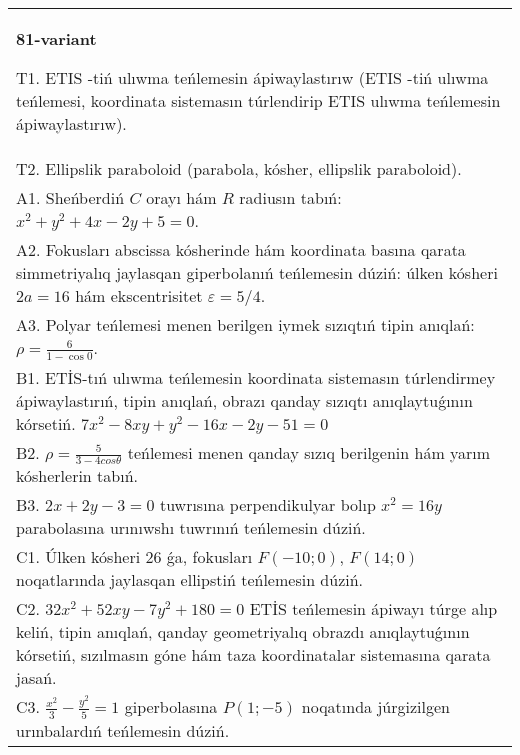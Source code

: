 \documentclass{article}
\begin{document}
\begin{tabular}{m{17cm}}
\textbf{81-variant}
\newline

T1. ETIS -tiń ulıwma teńlemesin ápiwaylastırıw (ETIS -tiń ulıwma teńlemesi, koordinata sistemasın túrlendirip ETIS ulıwma teńlemesin ápiwaylastırıw).\\

T2. Ellipslik paraboloid (parabola, kósher, ellipslik paraboloid).\\

A1. Sheńberdiń $C$ orayı hám $R$ radiusın tabıń: $x^2+y^2+4 x-2 y+5=0$.\\

A2. Fokusları abscissa kósherinde hám koordinata basına qarata simmetriyalıq jaylasqan giperbolanıń teńlemesin dúziń: úlken kósheri $2 a=16$ hám ekscentrisitet $\varepsilon=5/4$.\\

A3. Polyar teńlemesi menen berilgen iymek sızıqtıń tipin anıqlań: $\rho=\frac{6}{1-\cos 0}$.\\

B1. ETİS-tıń ulıwma teńlemesin koordinata sistemasın túrlendirmey ápiwaylastırıń, tipin anıqlań, obrazı qanday sızıqtı anıqlaytuǵının kórsetiń. $7x^{2} - 8xy + y^{2} - 16x - 2y - 51 = 0$  \\

B2. $\rho = \frac{5}{3 - 4cos\theta}$ teńlemesi menen qanday sızıq berilgenin hám yarım kósherlerin tabıń.  \\

B3. $2x + 2y - 3 = 0$ tuwrısına perpendikulyar bolıp $x^{2} = 16y$ parabolasına urınıwshı tuwrınıń teńlemesin dúziń.  \\

C1. Úlken kósheri 26 ǵa, fokusları $F( - 10;0)$, $F(14;0)$ noqatlarında jaylasqan ellipstiń teńlemesin dúziń.  \\

C2. $32x^{2} + 52xy - 7y^{2} + 180 = 0$ ETİS teńlemesin ápiwayı túrge alıp keliń, tipin anıqlań, qanday geometriyalıq obrazdı anıqlaytuǵının kórsetiń, sızılmasın góne hám taza koordinatalar sistemasına qarata jasań.  \\

C3. $\frac{x^{2}}{3} - \frac{y^{2}}{5} = 1$ giperbolasına $P(1; - 5)$ noqatında júrgizilgen urınbalardıń teńlemesin dúziń.\\

\end{tabular}
\vspace{1cm}
\end{document}
